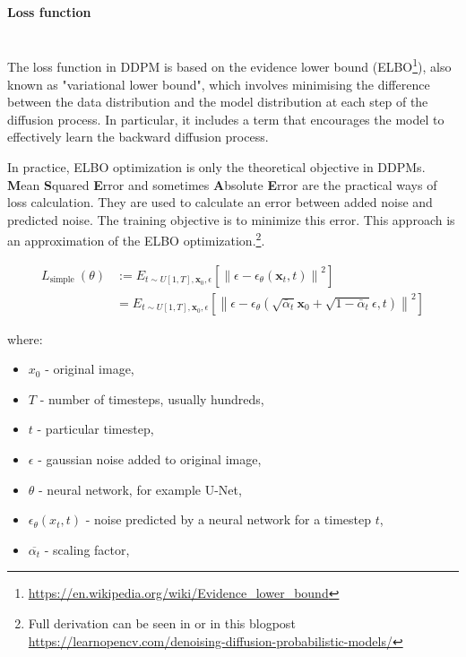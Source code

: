 \paragraph{Loss function}\mbox{}\\
\indent The loss function in DDPM is based on the evidence lower bound (ELBO\footnote{\url{https://en.wikipedia.org/wiki/Evidence_lower_bound}}), also known as "variational lower bound", which involves minimising the difference between the data distribution and the model distribution at each step of the diffusion process. In particular, it includes a term that encourages the model to effectively learn the backward diffusion process.

In practice, ELBO optimization is only the theoretical objective in DDPMs.
\textbf{M}ean \textbf{S}quared \textbf{E}rror and sometimes \textbf{A}bsolute \textbf{E}rror are the practical ways of loss calculation. They are used to calculate an error between added noise and predicted noise. The training objective is to minimize this error. This approach is an approximation of the ELBO optimization.\footnote{Full derivation can be seen in \cite{ho2020denoisingdiffusionprobabilisticmodels} or in this blogpost \url{https://learnopencv.com/denoising-diffusion-probabilistic-models/}}. 


\begin{equation}
\begin{aligned} L_{\text {simple }}(\theta) & :=E_{t \sim U[1, T], \mathbf{x}_0, \epsilon}\left[\left\|\epsilon-\epsilon_\theta\left(\mathbf{x}_t, t\right)\right\|^2\right] \\ & =E_{t \sim U[1, T], \mathbf{x}_0, \epsilon}\left[\left\|\epsilon-\epsilon_\theta\left(\sqrt{\bar{\alpha}_t} \mathbf{x}_0+\sqrt{1-\bar{\alpha}_t} \epsilon, t\right)\right\|^2\right]
\end{aligned}
\end{equation}

where:
\begin{itemize}
    \item $x_0$ - original image,
    \item $T$ - number of timesteps, usually hundreds,
    \item $t$ - particular timestep,
    \item $\epsilon$ - gaussian noise added to original image,
    \item $\theta$ - neural network, for example U-Net,
    \item $\epsilon_\theta(x_t, t)$ - noise predicted by a neural network for a timestep $t$,
    \item $\overline{\alpha_t}$ - scaling factor,
\end{itemize}

